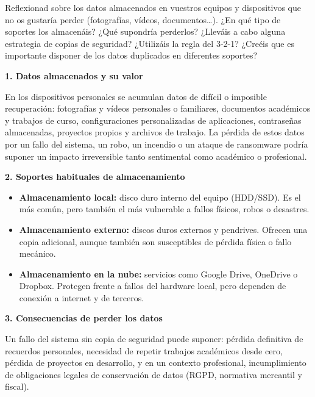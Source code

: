{
	Reflexionad sobre los datos almacenados en vuestros equipos y dispositivos que no os gustaría
	perder (fotografías, vídeos, documentos\ldots). ¿En qué tipo de soportes los almacenáis?
	¿Qué supondría perderlos? ¿Lleváis a cabo alguna estrategia de copias de seguridad? ¿Utilizáis
	la regla del 3-2-1? ¿Creéis que es importante disponer de los datos duplicados en diferentes
	soportes?
}

\begin{solution}

	\textbf{1. Datos almacenados y su valor}

	En los dispositivos personales se acumulan datos de difícil o imposible recuperación:
	fotografías y vídeos personales o familiares, documentos académicos y trabajos de curso,
	configuraciones personalizadas de aplicaciones, contraseñas almacenadas, proyectos propios
	y archivos de trabajo. La pérdida de estos datos por un fallo del sistema, un robo, un
	incendio o un ataque de ransomware podría suponer un impacto irreversible tanto sentimental
	como académico o profesional.

	\medskip

	\textbf{2. Soportes habituales de almacenamiento}

	\begin{itemize}
		\item \textbf{Almacenamiento local:} disco duro interno del equipo (HDD/SSD). Es el más
		      común, pero también el más vulnerable a fallos físicos, robos o desastres.
		\item \textbf{Almacenamiento externo:} discos duros externos y pendrives. Ofrecen una copia
		      adicional, aunque también son susceptibles de pérdida física o fallo mecánico.
		\item \textbf{Almacenamiento en la nube:} servicios como Google Drive, OneDrive o Dropbox.
		      Protegen frente a fallos del hardware local, pero dependen de conexión a internet y de
		      terceros.
	\end{itemize}

	\medskip

	\textbf{3. Consecuencias de perder los datos}

	Un fallo del sistema sin copia de seguridad puede suponer: pérdida definitiva de recuerdos
	personales, necesidad de repetir trabajos académicos desde cero, pérdida de proyectos en
	desarrollo, y en un contexto profesional, incumplimiento de obligaciones legales de
	conservación de datos (RGPD, normativa mercantil y fiscal).


\end{solution}
